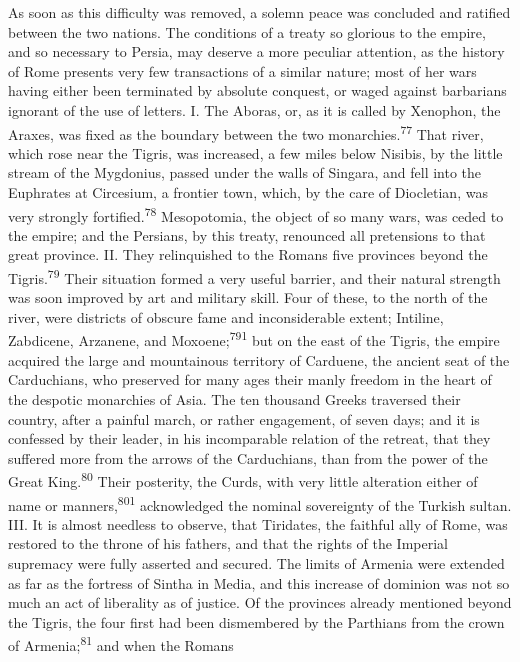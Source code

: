 As soon as this difficulty was removed, a solemn peace was
concluded and ratified between the two nations. The conditions of
a treaty so glorious to the empire, and so necessary to Persia,
may deserve a more peculiar attention, as the history of Rome
presents very few transactions of a similar nature; most of her
wars having either been terminated by absolute conquest, or waged
against barbarians ignorant of the use of letters. I. The Aboras,
or, as it is called by Xenophon, the Araxes, was fixed as the
boundary between the two monarchies.\textsuperscript{77} That river, which rose
near the Tigris, was increased, a few miles below Nisibis, by the
little stream of the Mygdonius, passed under the walls of
Singara, and fell into the Euphrates at Circesium, a frontier
town, which, by the care of Diocletian, was very strongly
fortified.\textsuperscript{78} Mesopotomia, the object of so many wars, was ceded
to the empire; and the Persians, by this treaty, renounced all
pretensions to that great province. II. They relinquished to the
Romans five provinces beyond the Tigris.\textsuperscript{79} Their situation
formed a very useful barrier, and their natural strength was soon
improved by art and military skill. Four of these, to the north
of the river, were districts of obscure fame and inconsiderable
extent; Intiline, Zabdicene, Arzanene, and Moxoene;\textsuperscript{791} but on
the east of the Tigris, the empire acquired the large and
mountainous territory of Carduene, the ancient seat of the
Carduchians, who preserved for many ages their manly freedom in
the heart of the despotic monarchies of Asia. The ten thousand
Greeks traversed their country, after a painful march, or rather
engagement, of seven days; and it is confessed by their leader,
in his incomparable relation of the retreat, that they suffered
more from the arrows of the Carduchians, than from the power of
the Great King.\textsuperscript{80} Their posterity, the Curds, with very little
alteration either of name or manners,\textsuperscript{801} acknowledged the
nominal sovereignty of the Turkish sultan. III. It is almost
needless to observe, that Tiridates, the faithful ally of Rome,
was restored to the throne of his fathers, and that the rights of
the Imperial supremacy were fully asserted and secured. The
limits of Armenia were extended as far as the fortress of Sintha
in Media, and this increase of dominion was not so much an act of
liberality as of justice. Of the provinces already mentioned
beyond the Tigris, the four first had been dismembered by the
Parthians from the crown of Armenia;\textsuperscript{81} and when the Romans
